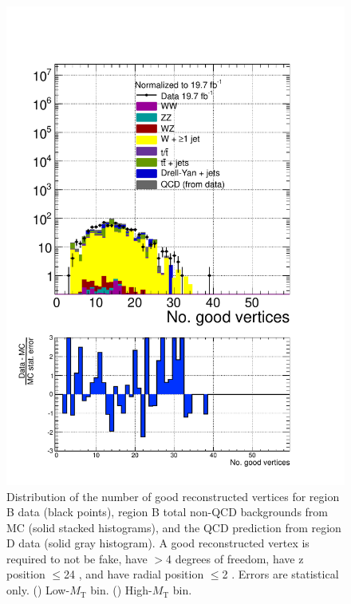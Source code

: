 \begin{figure}[hbtp]
\begin{center}
    \includegraphics[width=\cmsFigWidth]{figures/dataVsMCQCD_nGoodVtx_highMT_v87}
    \caption{Distribution of the number of good reconstructed vertices for region B data (black points), region B total non-QCD backgrounds from MC (solid stacked histograms), and the QCD prediction from region D data (solid gray histogram).  A good reconstructed vertex is required to not be fake, have $>$4 degrees of freedom, have z position $\le$24 \cm, and have radial position $\le$2 \cm.  Errors are statistical only. (\cmsLeft) Low-$M_{\text{T}}$ bin. (\cmsRight) High-$M_{\text{T}}$ bin.}
    \label{fig:regB-data-MC-nGoodVtx}
  \end{center}
\end{figure}

